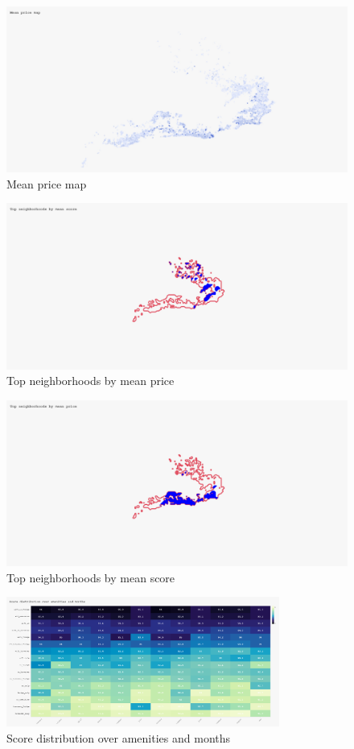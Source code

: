 \begin{figure}[H]
  \centering
  \includegraphics[width=1\textwidth]{images/q6_2.jpg}
  \caption{Mean price map}\label{fig:q6_2}
\end{figure}
\begin{figure}[H]
  \centering
  \includegraphics[width=1\textwidth]{images/q6_3.jpg}
  \caption{Top neighborhoods by mean price}\label{fig:q6_3}
\end{figure}

\begin{figure}[H]
  \centering
  \includegraphics[width=1\textwidth]{images/q6_4.jpg}
  \caption{Top neighborhoods by mean score}\label{fig:q6_4}
\end{figure}

\begin{figure}[H]
  \centering
  \includegraphics[width=0.8\textwidth]{images/q7_1.jpg}
  \caption{Score distribution over amenities and months}\label{fig:q7_1}
\end{figure}
